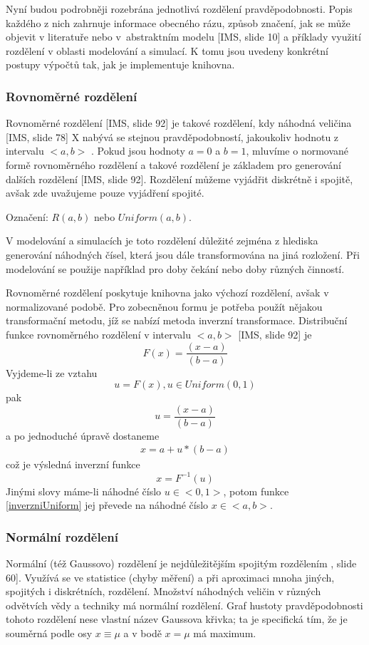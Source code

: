 \documentclass[a4paper,11pt]{article}
\begin{document}
Nyní budou podrobněji rozebrána jednotlivá rozdělení pravděpodobnosti. Popis každého z nich zahrnuje informace obecného rázu, způsob značení, jak se může objevit v literatuře nebo v abstraktním modelu [IMS, slide 10] a příklady využití rozdělení v oblasti modelování a simulací. K tomu jsou uvedeny konkrétní postupy výpočtů tak, jak je implementuje knihovna. 

\subsubsection{Rovnoměrné rozdělení}
Rovnoměrné rozdělení [IMS, slide 92] je takové rozdělení, kdy náhodná veličina [IMS, slide 78] X nabývá se stejnou pravděpodobností, jakoukoliv hodnotu z intervalu $<a, b>$ \cite{INM}. Pokud jsou hodnoty $a = 0$ a $b = 1$, mluvíme o normované formě rovnoměrného rozdělení a takové rozdělení je základem pro generování dalších rozdělení [IMS, slide 92]. Rozdělení můžeme vyjádřit diskrétně i spojitě, avšak zde uvažujeme pouze vyjádření spojité.

Označení: $R(a,b)$ nebo $Uniform(a,b)$.

V modelování a simulacích je toto rozdělení důležité zejména z hlediska generování náhodných čísel, která jsou dále transformována na jiná rozložení. Při modelování se použije například pro doby čekání nebo doby různých činností.

Rovnoměrné rozdělení poskytuje knihovna jako výchozí rozdělení, avšak v normalizované podobě. Pro zobecněnou formu je potřeba použít nějakou transformační metodu, jíž se nabízí metoda inverzní transformace. Distribuční funkce rovnoměrného rozdělení v intervalu $<a, b>$ [IMS, slide 92] je $$F(x) = \frac{(x-a)}{(b-a)}$$ Vyjdeme-li ze vztahu $$u = F(x), u \in Uniform(0, 1)$$pak $$u = \frac{(x-a)}{(b-a)}$$ a po jednoduché úpravě dostaneme 
\begin{eqnarray}\label{inverzniUniform}
x = a + u * (b-a)
\end{eqnarray}
což je výsledná inverzní funkce $$x=F^{-1}(u)$$ Jinými slovy máme-li náhodné číslo $u \in <0, 1>$, potom funkce \ref{inverzniUniform} jej převede na náhodné číslo $x \in <a, b>$.

\subsubsection{Normální rozdělení}

Normální (též Gaussovo) rozdělení je nejdůležitějším spojitým rozdělením \cite{INM}, slide 60]. Využívá se ve statistice (chyby měření) a při aproximaci mnoha jiných, spojitých i diskrétních, rozdělení. Množství náhodných veličin v různých odvětvích vědy a techniky má normální rozdělení. Graf hustoty pravděpodobnosti tohoto rozdělení nese vlastní název Gaussova křivka; ta je specifická tím, že je souměrná podle osy $x \equiv \mu$ a v bodě $x = \mu$ má maximum.
\end{document}
